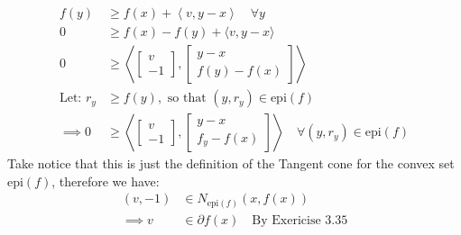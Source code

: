 \documentclass[]{article}
\begin{document}
    \begin{align*}\tag{3.36.2}\label{eqn:3.36.2}
        f(y) & \ge f(x) + \left\langle v, y - x \right\rangle \quad \forall y
        \\
        0 &\ge f(x) - f(y) + \langle v, y - x\rangle
        \\
        0 &\ge \left\langle 
            \begin{bmatrix}
                v \\ -1
            \end{bmatrix}, 
            \begin{bmatrix}
                y -x \\
                f(y) - f(x)
            \end{bmatrix}
        \right\rangle
        \\
        \text{Let: } r_y &\ge f(y), \text{ so that } (y, r_y) \in \text{epi}(f) 
        \\
        \implies 
        0 &\ge 
        \left\langle 
            \begin{bmatrix}
                v \\ -1
            \end{bmatrix}, 
            \begin{bmatrix}
                y -x \\
                f_y - f(x)
            \end{bmatrix}
        \right\rangle\quad \forall (y, r_y) \in \text{epi}(f)
    \end{align*}
    Take notice that this is just the definition of the Tangent cone for the convex set $\text{epi}(f)$, therefore we have: 
    \begin{align*}\tag{3.36.3}\label{eqn:3.36.3}
        (v, -1) &\in N_{\text{epi}(f)}(x, f(x)) 
        \\
        \implies
        v &\in \partial f(x) \quad \text{By Exericise 3.35}
    \end{align*}
    
\end{document}

